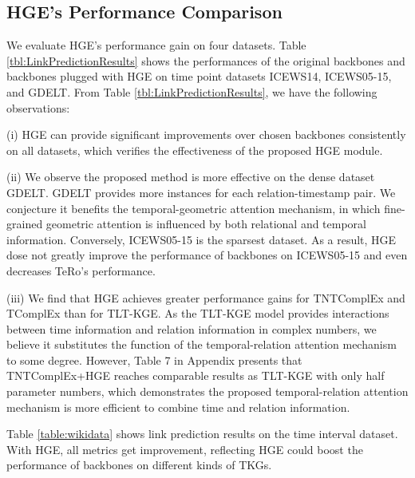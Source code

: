 \documentclass[letterpaper]{article} %
\begin{document}
\subsection{HGE's Performance Comparison}
We evaluate HGE's performance gain on four datasets. Table \ref{tbl:LinkPredictionResults} shows the performances of the original backbones and backbones plugged with HGE on time point datasets ICEWS14, ICEWS05-15, and GDELT. From Table \ref{tbl:LinkPredictionResults}, we have the following observations:

(i) HGE can provide significant improvements over chosen backbones consistently on all datasets, which verifies the effectiveness of the proposed HGE module. 

(ii) We observe the proposed method is more effective on the dense dataset GDELT. GDELT provides more instances for each relation-timestamp pair. We conjecture it benefits the temporal-geometric attention mechanism, in which fine-grained geometric attention is influenced by both relational and temporal information. Conversely, ICEWS05-15 is the sparsest dataset. As a result, HGE dose not greatly improve the performance of backbones on ICEWS05-15 and even decreases TeRo's performance.  

(iii) We find that HGE achieves greater performance gains for TNTComplEx and TComplEx than for TLT-KGE. As the TLT-KGE model provides interactions between time information and relation information in complex numbers, we believe it substitutes the function of the temporal-relation attention mechanism to some degree. However, Table 7 in Appendix  presents that TNTComplEx+HGE reaches comparable results as TLT-KGE with only half parameter numbers, which demonstrates the proposed temporal-relation attention mechanism is more efficient to combine time and relation information.
 

Table \ref{table:wikidata} shows link prediction results on the time interval dataset. With HGE, all metrics get improvement, reflecting HGE could boost the performance of backbones on different kinds of TKGs.
\end{document}
